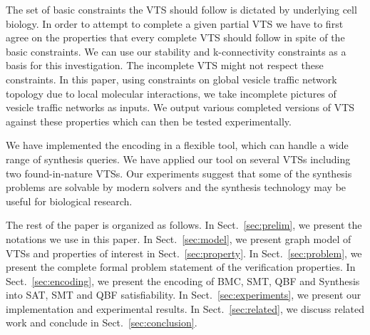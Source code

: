 %
The set of basic constraints the VTS should follow is dictated by underlying cell biology.   
%
In order to attempt to complete a given partial VTS we have to first agree on the properties that every complete VTS should follow in spite of the basic constraints. 
%
We can use our stability and k-connectivity constraints as a basis for this investigation.   
%
The incomplete VTS might not respect these constraints. 
%
In this paper, using constraints on global vesicle traffic network topology due to local molecular interactions, we take incomplete pictures of vesicle traffic networks as inputs.
%
We output various completed versions of VTS against these properties which can then be tested experimentally.
%

We have implemented the encoding in a flexible tool, which can handle a wide range of synthesis queries. 
%
We have applied our tool on several VTSs including
two found-in-nature VTSs.
%
Our experiments suggest that some of the synthesis problems are solvable by modern solvers and the synthesis technology may be useful for biological research.
%
%	
%

The rest of the paper is organized as follows. 
%
In Sect.~\ref{sec:prelim}, we present the notations we use in this paper. 
%
In Sect.~\ref{sec:model}, we present graph model of VTSs and  properties of interest in Sect.~\ref{sec:property}.
%
%
%
In Sect.~\ref{sec:problem}, we present the complete formal problem statement of the verification properties.
%
In Sect.~\ref{sec:encoding}, we present the encoding of BMC, SMT, QBF and Synthesis into SAT, SMT and QBF satisfiability. 
%
In Sect.~\ref{sec:experiments}, we present our implementation and experimental results. 
%
In Sect.~\ref{sec:related}, we discuss related work and conclude in Sect.~\ref{sec:conclusion}.
%
~        
